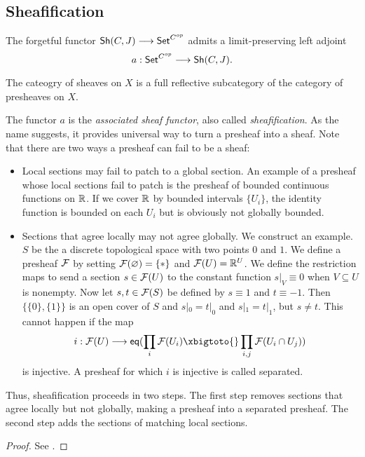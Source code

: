 \subsection{Sheafification}

\begin{theorem}
	The forgetful functor $\mathsf{Sh}(C,J) \longrightarrow \mathsf{Set}^{C^{op}}$ admits a limit-preserving left adjoint
	\[a : \mathsf{Set}^{C^{op}} \longrightarrow \mathsf{Sh}(C,J).\]
\end{theorem}
\begin{corollary}
	The cateogry of sheaves on $X$ is a full reflective subcategory of the category of presheaves on $X$.
\end{corollary}

The functor $a$ is the \textit{associated sheaf functor}, also called \textit{sheafification}. As the name suggests, it provides universal way to turn a presheaf into a sheaf.
Note that there are two ways a presheaf can fail to be a sheaf: 
\begin{itemize}
	\item 
		Local sections may fail to patch to a global section. An example of a presheaf whose local sections fail to patch is the presheaf of bounded continuous functions on $\mathbb{R}$. If we cover $\mathbb{R}$ by bounded intervals $\{U_i\}$, the identity function is bounded on each $U_i$ but is obviously not globally bounded. 
	\item 
		Sections that agree locally may not agree globally. We construct an example. $S$ be the a discrete topological space with two points $0$ and $1$. We define a presheaf $\mathcal{F}$ by setting $\mathcal{F}(\varnothing) = \{*\}$ and $\mathcal{F}(U) = \mathbb{R}^U$. We define the restriction maps to send a section $s \in \mathcal{F}(U)$ to the constant function $s|_V \equiv 0$ when $V \subseteq U$ is nonempty. Now let $s,t \in \mathcal{F}(S)$ be defined by $s \equiv 1$ and $t \equiv -1$. Then $\{\{0\}, \{1\}\}$ is an open cover of $S$ and $s|_{0} = t|_{0}$ and $s|_{1} = t|_{1}$, but $s \neq t$.
		This cannot happen if the map
		\[
			i: \Sh{F}(U) \to \mathsf{eq}(\prod_{i} \Sh{F}(U_i) \xbigtoto{} \prod_{i,j} \Sh{F}(U_i \cap U_j))
		\]
		is injective. A presheaf for which $i$ is injective is called separated.
\end{itemize} 

Thus, sheafification proceeds in two steps. The first step removes sections that agree locally but not globally, making a presheaf into a separated presheaf.  The second step adds the sections of matching local sections. 

\begin{proof}
	See \cite{MacLane/Moerdijk:1994}.
\end{proof}

